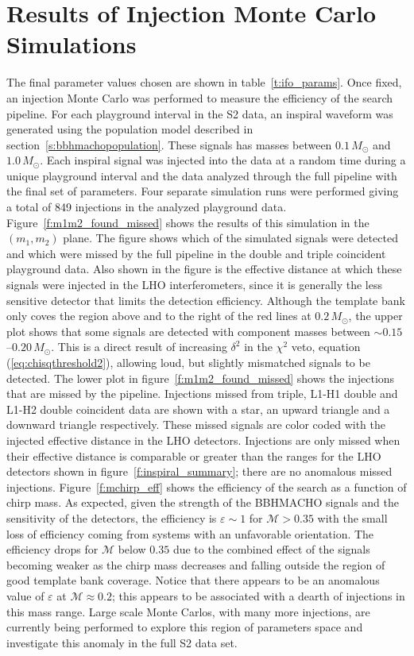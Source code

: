 \section{Results of Injection Monte Carlo Simulations}
\label{s:monte}

The final parameter values chosen are shown in table~\ref{t:ifo_params}. Once
fixed, an injection Monte Carlo was performed to measure the efficiency of the
search pipeline. For each playground interval in the S2 data, an inspiral
waveform was generated using the population model described in
section~\ref{s:bbhmachopopulation}. These signals has masses between
$0.1\,M_\odot$ and $1.0\,M_\odot$. Each inspiral signal was injected into the
data at a random time during a unique playground interval and the data
analyzed through the full pipeline with the final set of parameters. Four
separate simulation runs were performed giving a total of 849 injections in
the analyzed playground data.  Figure~\ref{f:m1m2_found_missed} shows the
results of this simulation in the $(m_1,m_2)$ plane. The figure shows which of
the simulated signals were detected and which were missed by the full pipeline
in the double and triple coincident playground data. Also shown in the figure
is the effective distance at which these signals were injected in the LHO
interferometers, since it is generally the less sensitive detector that limits
the detection efficiency.  Although the template bank only coves the region
above and to the right of the red lines at $0.2\,M_\odot$, the upper plot
shows that some signals are detected with component masses between $\sim
0.15$--$0.20\,M_\odot$. This is a direct result of increasing $\delta^2$ in
the $\chi^2$ veto, equation (\ref{eq:chisqthreshold2}), allowing loud, but
slightly mismatched signals to be detected. The lower plot in
figure~\ref{f:m1m2_found_missed} shows the injections that are missed by
the pipeline. Injections missed from triple, L1-H1 double and L1-H2 double
coincident data are shown with a star, an upward triangle and a downward
triangle respectively. These missed signals are color coded with the injected
effective distance in the LHO detectors. Injections are
only missed when their effective distance is comparable or greater than the
ranges for the LHO detectors shown in figure~\ref{f:inspiral_summary}; there
are no anomalous missed injections.  Figure~\ref{f:mchirp_eff} shows the
efficiency of the search as a function of chirp mass. As expected, given the
strength of the BBHMACHO signals and the sensitivity of the detectors, the
efficiency is $\varepsilon \sim 1$ for $\mathcal{M} >0.35$ with the small loss
of efficiency coming from systems with an unfavorable orientation. The
efficiency drops for $\mathcal{M}$ below $0.35$ due to the combined effect
of the signals becoming weaker as the chirp mass decreases and falling outside
the region of good template bank coverage.  Notice that there appears to be an
anomalous value of $\varepsilon$ at $\mathcal{M} \approx 0.2$; this appears to
be associated with a dearth of injections in this mass range.  Large scale
Monte Carlos, with many more injections, are currently being performed to
explore this region of parameters space and investigate this anomaly in the
full S2 data set.


